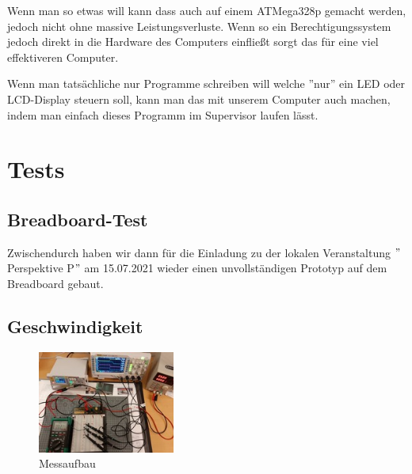 \documentclass{scrartcl}
\begin{document}
    Wenn man so etwas will kann dass auch auf einem ATMega328p gemacht werden, jedoch nicht ohne massive Leistungsverluste.
    Wenn so ein Berechtigungssystem jedoch direkt in die Hardware des Computers einfließt sorgt das für eine viel effektiveren Computer.

    Wenn man tatsächliche nur Programme schreiben will welche ''nur'' ein LED oder LCD-Display steuern soll, kann man das mit unserem Computer auch machen, indem man einfach dieses Programm im Supervisor laufen lässt.

    \section{Tests}
    \subsection{Breadboard-Test}
    Zwischendurch haben wir dann für die Einladung zu der lokalen Veranstaltung
    $"$Perspektive P$"$ am 15.07.2021 wieder einen unvollständigen Prototyp auf dem Breadboard gebaut.

    \subsection{Geschwindigkeit}
    \vspace{-15pt}
        \begin{figure}
        \vspace{-20pt}
        \begin{center}
        \includegraphics[width=0.4\textwidth]{20211208_200750_}
        \caption{Messaufbau\label{img:PD_Messurement}}
        \end{center}
        \vspace{-20pt}
        \end{figure}
\end{document}
